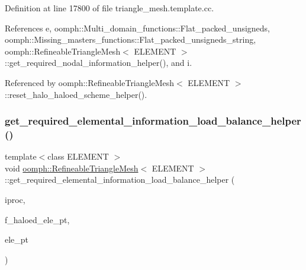 Definition at line 17800 of file triangle\+\_\+mesh.\+template.\+cc.



References e, oomph\+::\+Multi\+\_\+domain\+\_\+functions\+::\+Flat\+\_\+packed\+\_\+unsigneds, oomph\+::\+Missing\+\_\+masters\+\_\+functions\+::\+Flat\+\_\+packed\+\_\+unsigneds\+\_\+string, oomph\+::\+Refineable\+Triangle\+Mesh$<$ E\+L\+E\+M\+E\+N\+T $>$\+::get\+\_\+required\+\_\+nodal\+\_\+information\+\_\+helper(), and i.



Referenced by oomph\+::\+Refineable\+Triangle\+Mesh$<$ E\+L\+E\+M\+E\+N\+T $>$\+::reset\+\_\+halo\+\_\+haloed\+\_\+scheme\+\_\+helper().

\mbox{\label{classoomph_1_1RefineableTriangleMesh_a83ad5e6390903ae481046c480e02ff65}} 
\subsubsection{\texorpdfstring{get\+\_\+required\+\_\+elemental\+\_\+information\+\_\+load\+\_\+balance\+\_\+helper()}{get\_required\_elemental\_information\_load\_balance\_helper()}}
{\footnotesize\ttfamily template$<$class E\+L\+E\+M\+E\+NT $>$ \\
void \hyperlink{classoomph_1_1RefineableTriangleMesh}{oomph\+::\+Refineable\+Triangle\+Mesh}$<$ E\+L\+E\+M\+E\+NT $>$\+::get\+\_\+required\+\_\+elemental\+\_\+information\+\_\+load\+\_\+balance\+\_\+helper (\begin{DoxyParamCaption}\item[{unsigned \&}]{iproc,  }\item[{\hyperlink{classoomph_1_1Vector}{Vector}$<$ \hyperlink{classoomph_1_1Vector}{Vector}$<$ \hyperlink{classoomph_1_1FiniteElement}{Finite\+Element} $\ast$$>$ $>$ \&}]{f\+\_\+haloed\+\_\+ele\+\_\+pt,  }\item[{\hyperlink{classoomph_1_1FiniteElement}{Finite\+Element} $\ast$}]{ele\+\_\+pt }\end{DoxyParamCaption})\hspace{0.3cm}{\ttfamily [protected]}}



